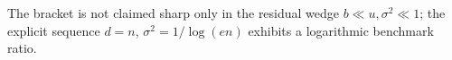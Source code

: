 The bracket is not claimed sharp only in the residual wedge \(b\ll u,\sigma^2\ll1\); the explicit sequence \(d=n\), \(\sigma^2=1/\log(en)\) exhibits a logarithmic benchmark ratio.